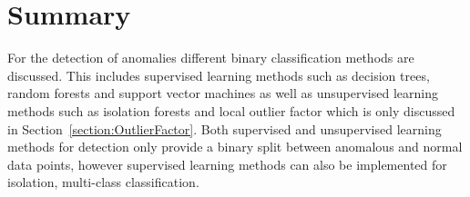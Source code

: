 \section{Summary}
For the detection of anomalies different binary classification methods are discussed. This includes supervised learning methods such as decision trees, random forests and support vector machines as well as unsupervised learning methods such as isolation forests and local outlier factor which is only discussed in Section~\ref{section:OutlierFactor}. Both supervised and unsupervised learning methods for detection only provide a binary split between anomalous and normal data points, however supervised learning methods can also be implemented for isolation, multi-class classification.